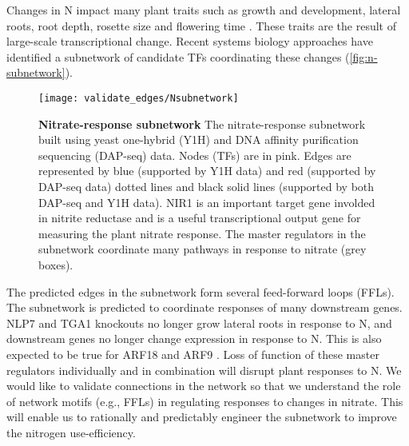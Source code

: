 \documentclass[../main.tex]{subfiles}
\begin{document}
Changes in N impact many plant traits such as growth and development, lateral roots, root depth, rosette size and flowering time \autocite{abalosPlantTraitbasedApproaches2019,castromarinNitrateRegulatesFloral2011}.
These traits are the result of large\hyp{}scale transcriptional change.
Recent systems biology approaches have identified a subnetwork of candidate TFs coordinating these changes \autocite{gaudinierTranscriptionalRegulationNitrogenassociated2018,varalaTemporalTranscriptionalLogic2018} (\autoref{fig:n-subnetwork}).

\begin{figure}[hbt!]
	\begin{center}
		\capstart
		\texttt{[image: validate\_edges/Nsubnetwork]}
		\caption{
			\textbf{Nitrate\hyp{}response subnetwork}
			The nitrate\hyp{}response subnetwork built using yeast one\hyp{}hybrid (Y1H) \autocite{gaudinierTranscriptionalRegulationNitrogenassociated2018} and DNA affinity purification sequencing (DAP-seq) \autocite{omalleyCistromeEpicistromeFeatures2016} data.
            Nodes (TFs) are in pink.
            Edges are represented by blue (supported by Y1H data) and red (supported by DAP-seq data) dotted lines and black solid lines (supported by both DAP-seq and Y1H data).
            NIR1 is an important target gene involded in nitrite reductase and is a useful transcriptional output gene for measuring the plant nitrate response.
            The master regulators in the subnetwork coordinate many pathways in response to nitrate (grey boxes).
			\label{fig:n-subnetwork}
		}
	\end{center}
\end{figure}

The predicted edges in the subnetwork form several feed\hyp{}forward loops (FFLs).
The subnetwork is predicted to coordinate responses of many downstream genes.
NLP7 and TGA1 knockouts no longer grow lateral roots in response to N, and downstream genes no longer change expression in response to N.
This is also expected to be true for ARF18 and ARF9 \autocite{gaudinierTranscriptionalRegulationNitrogenassociated2018}.
Loss of function of these master regulators individually and in combination will disrupt plant responses to N.
We would like to validate connections in the network so that we understand the role of network motifs (e.g., FFLs) in regulating responses to changes in nitrate.
This will enable us to rationally and predictably engineer the subnetwork to improve the nitrogen use\hyp{}efficiency.
\end{document}
